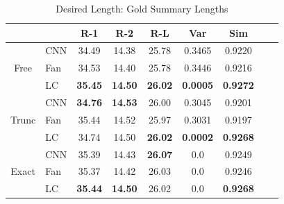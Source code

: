\begin{table}[h]
	\small
	\centering
	\caption{Desired Length: Gold Summary Lengths}
	\label{table:gold}
	\begin{tabular}{lcccccccc}
		\hline
		\multicolumn{2}{c}{}                                                     & R-1 & R-2 & R-L & Var & Sim \\ \hline
		\multicolumn{1}{c|}{\multirow{3}{*}{Free}} &
		\multicolumn{1}{l|}{CNN} & 34.49 & 14.38 & 25.78 & 0.3465 & 0.9220 \\ \cline{2-7}
		\multicolumn{1}{c|}{}                        & \multicolumn{1}{l|}{Fan} & 34.53 & 14.40 & 25.78 & 0.3446 & 0.9216 \\ \cline{2-7}
		\multicolumn{1}{c|}{}                        & \multicolumn{1}{l|}{LC} & \bf 35.45 & \bf 14.50 & \bf 26.02 & \bf 0.0005 & \bf 0.9272\\ \cline{2-7}
        \hline
		\multicolumn{1}{c|}{\multirow{3}{*}{Trunc}} &
		\multicolumn{1}{l|}{CNN} & \bf 34.76 & \bf 14.53 & 26.00 & 0.3045 & 0.9201 \\ \cline{2-7}
		\multicolumn{1}{c|}{}                        & \multicolumn{1}{l|}{Fan} & 35.44 & 14.52 & 25.97 & 0.3031 & 0.9197 \\ \cline{2-7}
		\multicolumn{1}{c|}{}                        & \multicolumn{1}{l|}{LC} & 34.74 & 14.50 & \bf 26.02 & \bf 0.0002 & \bf 0.9268\\ \cline{2-7}
        \hline
		\multicolumn{1}{c|}{\multirow{3}{*}{Exact}} &
		\multicolumn{1}{l|}{CNN} & 35.39 & 14.43  & \bf 26.07 & 0.0 & 0.9249 \\ \cline{2-7}
		\multicolumn{1}{c|}{}                        & \multicolumn{1}{l|}{Fan} & 35.37 & 14.42 & 26.03 & 0.0 & 0.9246 \\ \cline{2-7}
		\multicolumn{1}{c|}{}                        & \multicolumn{1}{l|}{LC} & \bf 35.44 & \bf 14.50 & 26.02 & 0.0 & \bf 0.9268 \\ \cline{2-7}
		\hline
	\end{tabular}
\end{table}

